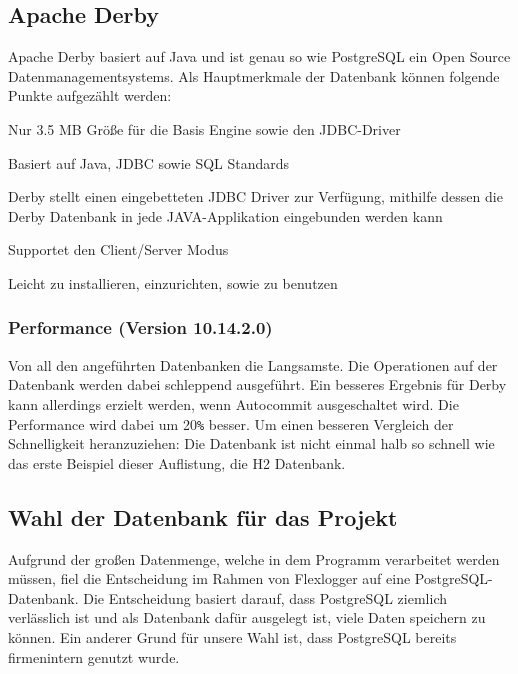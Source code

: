  
\subsection{Apache Derby}

Apache Derby basiert auf Java und ist genau so wie PostgreSQL ein Open Source Datenmanagementsystems. Als Hauptmerkmale der Datenbank können folgende Punkte aufgezählt werden: 

\begin{compactitem}
    \item Nur 3.5 MB Größe für die Basis Engine sowie den JDBC-Driver        
    \item Basiert auf Java, JDBC sowie SQL Standards
    \item Derby stellt einen eingebetteten JDBC Driver zur Verfügung, mithilfe dessen die Derby Datenbank in jede JAVA-Applikation eingebunden werden kann
    \item Supportet den Client/Server Modus
    \item Leicht zu installieren, einzurichten, sowie zu benutzen
\end{compactitem}
\cite{ApacheDerbyOfficialSite}
 

\subsubsection{Performance (Version 10.14.2.0)}
Von all den angeführten Datenbanken die Langsamste. Die Operationen auf der Datenbank werden dabei schleppend ausgeführt. Ein besseres Ergebnis für Derby kann allerdings erzielt werden, wenn Autocommit ausgeschaltet wird. Die Performance wird dabei um 20\texttt{\%} besser. Um einen besseren Vergleich der Schnelligkeit heranzuziehen: Die Datenbank ist nicht einmal halb so schnell wie das erste Beispiel dieser Auflistung, die H2 Datenbank. \cite{databaseComparison}

\subsection{Wahl der Datenbank für das Projekt}
Aufgrund der großen Datenmenge, welche in dem Programm verarbeitet werden müssen, fiel die Entscheidung im Rahmen von Flexlogger auf eine PostgreSQL-Datenbank. Die Entscheidung basiert darauf, dass PostgreSQL ziemlich verlässlich ist und als Datenbank dafür ausgelegt ist, viele Daten speichern zu können. Ein anderer Grund für unsere Wahl ist, dass PostgreSQL bereits firmenintern genutzt wurde.